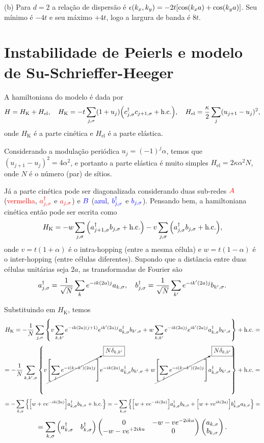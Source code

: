 \documentclass[a4paper,10pt]{article}
\begin{document}
(b) Para $d = 2$ a relação de dispersão é $\epsilon(k_x, k_y) = -2t [\cos(k_x a) + \cos(k_y a)]$. Seu mínimo é $-4t$ e seu máximo $+4t$, logo a largura de banda é $8t$.


\pagebreak

\section{Instabilidade de Peierls e modelo de Su-Schrieffer-Heeger}

A hamiltoniana do modelo é dada por
$$
H = H_{\text{K}} + H_{\text{el}},
\quad
H_{\text{K}} = -t \sum_{j,\sigma} (1 + u_j) \qty(c_{j,\sigma}^\dagger c_{j+1, \sigma} + \text{h.c.}),
\quad
H_{\text{el}} = \frac{\kappa}{2} \sum_{j} (u_{j+1} - u_j)^2,
$$
onde $H_{\text{K}}$ é a parte cinética e $H_{\text{el}}$ é a parte elástica.

Considerando a modulação periódica $u_j = (-1)^j \alpha$, temos que $(u_{j+1} - u_j)^2 = 4 \alpha^2$, e portanto a parte elástica é muito simples $H_{\text{el}} = 2 \kappa \alpha^2 N$, onde $N$ é o número (par) de sítios.

Já a parte cinética pode ser diagonalizada considerando duas sub-redes $\textcolor{red}{A}$ (\textcolor{red}{vermelha}, $\textcolor{red}{a_{j,\sigma}^\dagger}$ e $\textcolor{red}{a_{j,\sigma}}$) e $\textcolor{blue}{B}$ (\textcolor{blue}{azul}, $\textcolor{blue}{b_{j,\sigma}^\dagger}$ e $\textcolor{blue}{b_{j,\sigma}}$). Pensando bem, a hamiltoniana cinética então pode ser escrita como
$$
H_{\text{K}} = -w \sum_{j, \sigma} \qty(a_{j+1,\sigma}^\dagger b_{j,\sigma} + \text{h.c.})
-v \sum_{j,\sigma} \qty(a_{j,\sigma}^\dagger b_{j,\sigma} + \text{h.c.}),
$$
onde $v = t(1+\alpha)$ é o intra-hopping (entre a mesma célula) e $w = t(1-\alpha)$ é o inter-hopping (entre células diferentes). Supondo que a distância entre duas células unitárias seja $2a$, as transformadas de Fourier são
$$
a_{j,\sigma}^\dagger = \frac{1}{\sqrt{N}} \sum_{k} e^{-ik (2a) j} a_{k,\sigma}, \quad
b_{j,\sigma}^\dagger = \frac{1}{\sqrt{N}} \sum_{k'} e^{-ik' (2a) j} b_{k',\sigma}.
$$

Substituindo em $H_{\text{K}}$, temos
$$
H_{\text{K}} = - \frac{1}{N}
\sum_{j,\sigma} \qty{ v
\sum_{k,k'} e^{-ik(2a)(j+1)} e^{ik'(2a)j} a_{k,\sigma}^\dagger b_{k',\sigma}
+ w
\sum_{k,k'} e^{-ik(2a)j} e^{ik'(2a)j} a_{k,\sigma}^\dagger b_{k',\sigma}} + \text{h.c.} =
$$
$$
= - \frac{1}{N}
\sum_{k, k', \sigma} \qty{ v
\cancelto{\boxed{N \delta_{k,k'}}}{\qty[\sum_{j} e^{-i(k-k')(2a)j}]}
e^{-ik(2a)} a_{k,\sigma}^\dagger b_{k',\sigma}
+ w
\cancelto{\boxed{N \delta_{k,k'}}}{\qty[\sum_{j} e^{-i(k-k')(2a)j}]}
a_{k,\sigma}^\dagger b_{k',\sigma}} + \text{h.c.} =
$$
$$
= - \sum_{k, \sigma} \qty{ \qty[ w  + v
e^{-ik(2a)}]
a_{k,\sigma}^\dagger b_{k,\sigma} + \text{h.c.} } =
- \sum_{k, \sigma} \qty{ \qty[ w  + v
e^{-ik(2a)}]
a_{k,\sigma}^\dagger b_{k,\sigma} +
\qty[ w  + v
e^{ik(2a)}]
b_{k,\sigma}^\dagger a_{k,\sigma}
} =
$$
$$
= \sum_{k, \sigma}
\begin{pmatrix}
a_{k,\sigma}^\dagger & b_{k,\sigma}^\dagger
\end{pmatrix}
\begin{pmatrix}
0 & -w - v e^{-2ika} \\
-w - v e^{+2ika} & 0
\end{pmatrix}
\begin{pmatrix}
a_{k,\sigma} \\ b_{k,\sigma}
\end{pmatrix}.
$$
\end{document}
